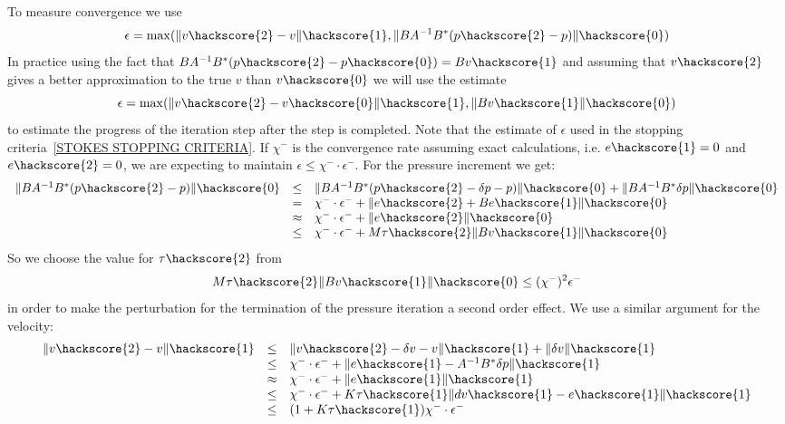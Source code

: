 To measure convergence we use
\begin{equation} 
\epsilon = \max(\|v\hackscore{2}-v\|\hackscore{1}, \|B A^{-1} B^{*} (p\hackscore{2}-p)\|\hackscore{0})
\end{equation}
In practice using the fact that $B A^{-1} B^{*} (p\hackscore{2}-p\hackscore{0}) = B v\hackscore{1}$
and assuming that $v\hackscore{2}$ gives a better approximation to the true $v$ than
$v\hackscore{0}$ we will use the estimate
\begin{equation} 
\epsilon = \max(\|v\hackscore{2}-v\hackscore{0}\|\hackscore{1}, \|B v\hackscore{1}\|\hackscore{0})
\end{equation}
to estimate the progress of the iteration step after the step is completed. 
Note that the estimate of $\epsilon$   
used in the stopping criteria~\ref{STOKES STOPPING CRITERIA}. If $\chi^{-}$ is the convergence rate assuming
exact calculations, i.e. $e\hackscore{1}=0$ and $e\hackscore{2}=0$, we are expecting 
to maintain $\epsilon \le \chi^{-} \cdot \epsilon^{-}$. For the 
pressure increment we get:
\begin{equation} \label{STOKES EST 1}
\begin{array}{rcl}
\|B A^{-1} B^{*} (p\hackscore{2}-p)\|\hackscore{0}
 & \le & \|B A^{-1} B^{*} (p\hackscore{2}-\delta p-p)\|\hackscore{0} +
\|B A^{-1} B^{*} \delta p\|\hackscore{0} \\
 & = & \chi^{-} \cdot \epsilon^{-} + \|e\hackscore{2} + B e\hackscore{1}\|\hackscore{0}  \\
& \approx & \chi^{-} \cdot \epsilon^{-} + \|e\hackscore{2}\|\hackscore{0} \\
& \le & \chi^{-} \cdot \epsilon^{-} + M \tau\hackscore{2} \|B v\hackscore{1}\|\hackscore{0} \\  
\end{array}
\end{equation}
So we choose the value for $\tau\hackscore{2}$ from 
\begin{equation} \label{STOKES TOL2}
 M \tau\hackscore{2} \|B v\hackscore{1}\|\hackscore{0}  \le (\chi^{-})^2 \epsilon^{-}
\end{equation}
in order to make the perturbation for the termination of the pressure iteration a second order effect. We use a
similar argument for the velocity:
\begin{equation}\label{STOKES EST 2}
\begin{array}{rcl}
\|v\hackscore{2}-v\|\hackscore{1} & \le & \|v\hackscore{2}-\delta v-v\|\hackscore{1} + \| \delta v\|\hackscore{1} \\
& \le &  \chi^{-} \cdot \epsilon^{-}  + \| e\hackscore{1} -  A^{-1} B^{*}\delta p \|\hackscore{1} \\
& \approx &  \chi^{-} \cdot \epsilon^{-}  + \| e\hackscore{1} \|\hackscore{1} \\
& \le &  \chi^{-} \cdot \epsilon^{-}  +  K \tau\hackscore{1} \| dv\hackscore{1} - e\hackscore{1} \|\hackscore{1}
\\
& \le &  ( 1  + K \tau\hackscore{1}) \chi^{-} \cdot \epsilon^{-}
\end{array}
\end{equation}
